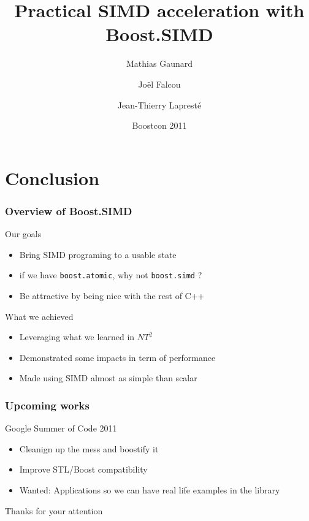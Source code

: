 \documentclass{beamer}
\title{Practical SIMD acceleration with Boost.SIMD}
\author{Mathias Gaunard \and Joël Falcou \and Jean-Thierry Lapresté}
\institute[MetaScale]{MetaScale Inc.}
\date[BOOST 2011]{Boostcon 2011}
\begin{document}


\begin{frame}
\titlepage
\end{frame}





\section{Conclusion}
\frame
{
  \frametitle{Overview of Boost.SIMD}
  \begin{block}{Our goals}
   \begin{itemize}
\footnotesize
\item Bring SIMD programing to a usable state
\item if we have \texttt{boost.atomic}, why not \texttt{boost.simd} ?
\item Be attractive by being nice with the rest of C++
\end{itemize}
  \end{block}{}

 \begin{block}{What we achieved}
   \begin{itemize}
\footnotesize
\item Leveraging what we learned in $NT^2$
 \item Demonstrated some impacts in term of performance
 \item Made using SIMD almost as simple than scalar
\end{itemize}
  \end{block}{}
}

\frame
{
  \frametitle{Upcoming works}

 \begin{block}{Google Summer of Code 2011}
   \begin{itemize}
\footnotesize
\item Cleanign up the mess and boostify it
 \item Improve STL/Boost compatibility
 \item Wanted: Applications so we can have real life examples in the library
\end{itemize}
  \end{block}{}
}

\frame
{
\begin{center}\Huge Thanks for your attention\end{center}
}
\end{document}
